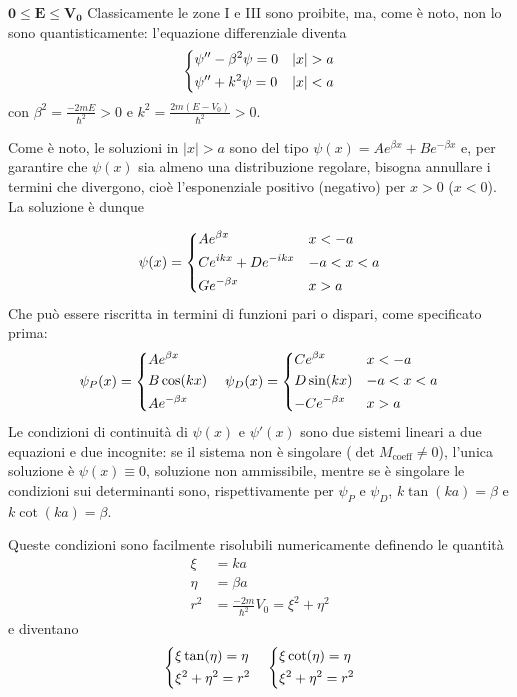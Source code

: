\item $\mathbf{0\leq E\leq V_0}$
   Classicamente le zone I e III sono proibite, ma, come è noto, non lo sono quantisticamente:
   l'equazione differenziale diventa
   $$
   \begin{dcases}
       \psi'' - \beta^2\psi = 0 & |x| >a\\
       \psi'' + k^2\psi = 0 & |x| <a
   \end{dcases}
   $$
   con $\beta^2 = \frac{-2mE}{\hbar^2}>0$ e $k^2=\frac{2m(E-V_0)}{\hbar^2}>0$.

   Come è noto, le soluzioni in $|x|>a$ sono del tipo $\psi(x) = Ae^{\beta x}+Be^{-\beta x}$ e, per
   garantire che $\psi(x)$ sia almeno una distribuzione regolare, bisogna annullare i termini che divergono,
   cioè l'esponenziale positivo (negativo) per $x>0$ ($x<0$).
   La soluzione è dunque

   $$
    \psi(x) =
    \begin{dcases}
	Ae^{\beta x} & x< -a \\
	Ce^{ikx}+De^{-ikx} & -a<x<a \\
	Ge^{-\beta x} & x>a
    \end{dcases}
   $$
Che può essere riscritta in termini di funzioni pari o dispari, come specificato prima:
$$
\psi_P(x) =
    \begin{dcases}
	Ae^{\beta x} \\
	B\cos(kx) \\
	Ae^{-\beta x}
    \end{dcases}
    \quad
\psi_D(x) = 
    \begin{dcases}
	Ce^{\beta x} &x< -a\\
	D\sin(kx) &-a<x<a\\
	-Ce^{-\beta x}&x>a
    \end{dcases}
$$
Le condizioni di continuità di $\psi(x)$ e $\psi'(x)$ sono due sistemi lineari a due equazioni e due
incognite: se il sistema non è singolare ($\det M_{\text{coeff}} \neq 0$), l'unica soluzione è $\psi(x)\equiv 0$,
soluzione non ammissibile, mentre se è singolare le condizioni sui determinanti sono, rispettivamente per
$\psi_P$ e $\psi_D$, $k\tan(ka)=\beta$ e $k\cot(ka)=\beta$.

Queste condizioni sono facilmente risolubili numericamente definendo le quantità
\begin{align*}
    \xi &= ka\\
    \eta &= \beta a\\
    r^2 &= \frac{-2m}{\hbar^2}V_0 = \xi^2+\eta^2
\end{align*}
e diventano
$$
\begin{dcases}
\xi\tan(\eta) = \eta\\
\xi^2 + \eta^2 = r^2
\end{dcases}
\quad
\begin{dcases}
\xi\cot(\eta) = \eta\\
\xi^2 + \eta^2 = r^2
\end{dcases}
$$


